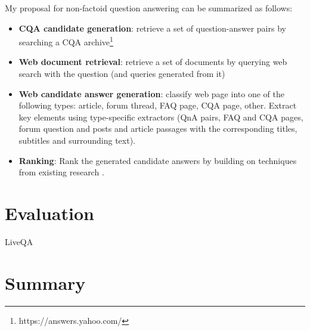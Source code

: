 My proposal for non-factoid question answering can be summarized as follows:
\begin{itemize}
\setlength\itemsep{0em}
\item \textbf{CQA candidate generation}: retrieve a set of question-answer pairs by searching a CQA archive\footnote{https://answers.yahoo.com/}
\item \textbf{Web document retrieval}: retrieve a set of documents by querying web search with the question (and queries generated from it)
\item \textbf{Web candidate answer generation}: classify web page into one of the following types: article, forum thread, FAQ page, CQA page, other. Extract key elements using type-specific extractors (QnA pairs, FAQ and CQA pages, forum question and posts and article passages with the corresponding titles, subtitles and surrounding text).
\item \textbf{Ranking}: Rank the generated candidate answers by building on techniques from existing research \cite{surdeanu2011learning}.
\end{itemize}


\section{Evaluation}
LiveQA


\section{Summary}
